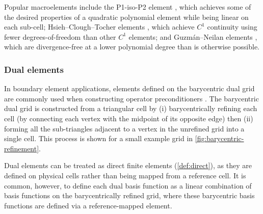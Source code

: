 \documentclass[sn-mathphys-num]{sn-jnl}%
\theoremstyle{thmstyleone}%
\theoremstyle{thmstyletwo}%
\theoremstyle{thmstylethree}%
\begin{document}
Popular macroelements include
the P1-iso-P2 element \cite{p1-iso-p2}, which achieves some of the desired properties of a quadratic polynomial element while being linear on each sub-cell;
Hsieh--Clough--Tocher elements \cite{hct-0,hct-1,hct-2}, which achieve $C^1$ continuity using fewer degrees-of-freedom than other $C^1$ elements;
and Guzm\'an--Neilan elements \cite{guzman-neilan}, which are divergence-free at a lower polynomial degree than is otherwise possible.

\subsubsection{Dual elements}
In boundary element applications, elements defined on the barycentric dual grid are commonly used when constructing
operator preconditioners \cite{bc}. The barycentric dual grid is constructed from a triangular cell by
(i) barycentrically refining each cell (by connecting each vertex with the midpoint of its opposite edge)
then (ii) forming all the sub-triangles adjacent to a vertex in the unrefined
grid into a single cell. This process is shown for a small example grid in \cref{fig:barycentric-refinement}.

Dual elements can be treated as direct finite elements (\cref{def:direct}), as they are defined on
physical cells rather than being mapped from a reference cell. It is common, however, to define
each dual basis function as a linear combination of basis functions on the barycentrically refined
grid, where these barycentric basis functions are defined via a reference-mapped element.
\end{document}
